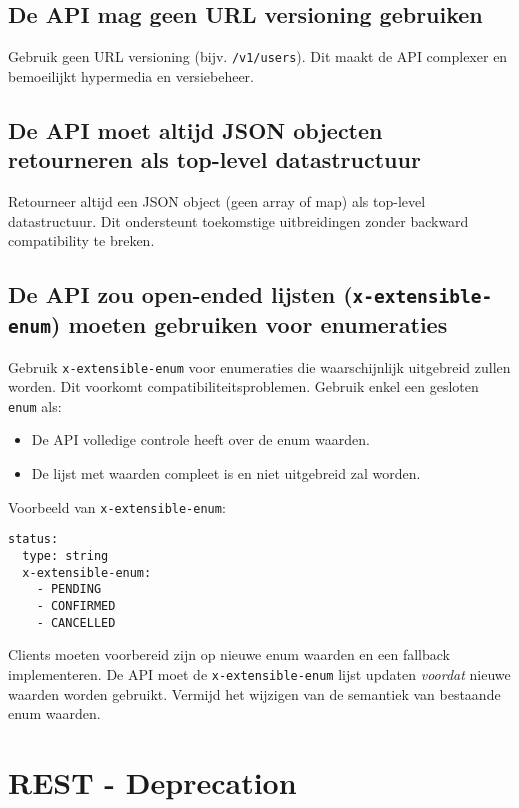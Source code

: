 \subsection{De API mag geen URL versioning gebruiken}
\label{subsection:geen_url_versioning}

Gebruik geen URL versioning (bijv. \texttt{/v1/users}). Dit maakt de API complexer en bemoeilijkt hypermedia en versiebeheer.

\subsection{De API moet altijd JSON objecten retourneren als top-level datastructuur}
\label{subsection:json_object_top_level}

Retourneer altijd een JSON object (geen array of map) als top-level datastructuur. Dit ondersteunt toekomstige uitbreidingen zonder backward compatibility te breken.

\subsection{De API zou open-ended lijsten (\texttt{x-extensible-enum}) moeten gebruiken voor enumeraties}
\label{subsection:open_ended_enums}

Gebruik \texttt{x-extensible-enum} voor enumeraties die waarschijnlijk uitgebreid zullen worden. Dit voorkomt compatibiliteitsproblemen. Gebruik enkel een gesloten \texttt{enum} als:

\begin{itemize}
    \item De API volledige controle heeft over de enum waarden.
    \item De lijst met waarden compleet is en niet uitgebreid zal worden.
\end{itemize}

Voorbeeld van \texttt{x-extensible-enum}:

\begin{verbatim}
status:
  type: string
  x-extensible-enum:
    - PENDING
    - CONFIRMED
    - CANCELLED
\end{verbatim}

Clients moeten voorbereid zijn op nieuwe enum waarden en een fallback implementeren. De API moet de \texttt{x-extensible-enum} lijst updaten \textit{voordat} nieuwe waarden worden gebruikt. Vermijd het wijzigen van de semantiek van bestaande enum waarden.

\section{REST - Deprecation}


